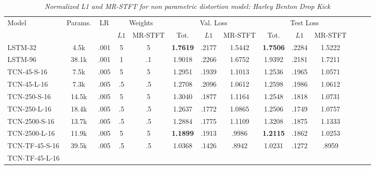 \setlength{\tabcolsep}{4pt}
\begin{table*}[h]
    \centering
    \small
    \caption{\textit{Normalized L1 and MR-STFT for non parametric distortion model: Harley Benton Drop Kick}}
    \begin{tabular}{lccccccccccccc}
        \toprule
        \multirow{2}{*}{Model}
            & \multirow{2}{*}{Params.}
                & \multirow{2}{*}{LR}
                    & \multicolumn{2}{c}{Weights}
                        & \multicolumn{3}{c}{Val. Loss}
                            & \multicolumn{3}{c}{Test Loss} \\ 
        \cmidrule(lr){4-5} 
            \cmidrule(lr){6-8} 
                \cmidrule(lr){9-11}
        &   &   & $L1$ & MR-STFT & Tot. & $L1$ & MR-STFT & Tot. & $L1$ & MR-STFT \\ 
        \midrule
        LSTM-32
            & 4.5k  & .001 & 5 & 5 & \textbf{1.7619} & .2177 & 1.5442 & \textbf{1.7506} & .2284 & 1.5222 & \\
        LSTM-96       
            & 38.1k & .001 & 1 & .1 & 1.9018 & .2266 & 1.6752 & 1.9392 & .2181 & 1.7211 & \\
        \midrule
        TCN-45-S-16               
            & 7.5k & .005 & 5 & 5 & 1.2951 & .1939 & 1.1013 & 1.2536 & .1965 & 1.0571 & \\ 
        TCN-45-L-16               
            & 7.3k & .005 & .5 & .5 & 1.2708 & .2096 & 1.0612 & 1.2598 & .1986 & 1.0612 & \\
        TCN-250-S-16               
            & 14.5k & .005 & 5 & 5 & 1.3040 & .1877 & 1.1164 & 1.2548 & .1818 & 1.0731 & \\ 
        TCN-250-L-16               
            & 18.4k & .005 & .5 & .5 & 1.2637 & .1772 & 1.0865 & 1.2506 & .1749 & 1.0757 & \\
        TCN-2500-S-16               
            & 13.7k & .005 & .5 & .5 & 1.2884 & .1775 & 1.1109 & 1.3208 & .1875 & 1.1333 & \\ 
        TCN-2500-L-16               
            & 11.9k & .005 & 5 & 5 & \textbf{1.1899} & .1913 & .9986 & \textbf{1.2115} & .1862 & 1.0253 & \\
        \midrule
        TCN-TF-45-S-16               
            & 39.5k & .005 & .5 & .5 & 1.0368 & .1426 & .8942 & 1.0231 & .1272 & .8959 & \\
        TCN-TF-45-L-16               

\end{tabular}
\end{table*}
